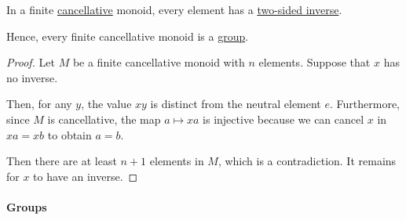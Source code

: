 \begin{proposition}\label{thm:finite_cancellative_monoid_inverse}
  In a finite \hyperref[def:binary_operation/cancellative]{cancellative} monoid, every element has a \hyperref[def:monoid_inverse]{two-sided inverse}.
\end{proposition}
\begin{comments}
  \item Hence, every finite cancellative monoid is a \hyperref[def:group]{group}.
\end{comments}
\begin{proof}
  Let \( M \) be a finite cancellative monoid with \( n \) elements. Suppose that \( x \) has no inverse.

  Then, for any \( y \), the value \( xy \) is distinct from the neutral element \( e \). Furthermore, since \( M \) is cancellative, the map \( a \mapsto xa \) is injective because we can cancel \( x \) in \( xa = xb \) to obtain \( a = b \).

  Then there are at least \( n + 1 \) elements in \( M \), which is a contradiction. It remains for \( x \) to have an inverse.
\end{proof}

\paragraph{Groups}

